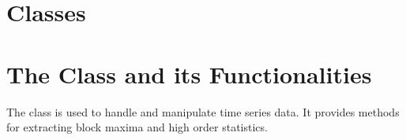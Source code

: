 \documentclass[a4paper,11pt,openany,english]{sphinxmanual}
\begin{document}
\section{Classes}
\label{\detokenize{api_topt:classes}}

\section{The  Class and its Functionalities}
\label{\detokenize{api_topt:the-timeseries-class-and-its-functionalities}}
\sphinxAtStartPar
The  class is used to handle and manipulate time series data. It provides methods for extracting block maxima and high order statistics.
\end{document}
